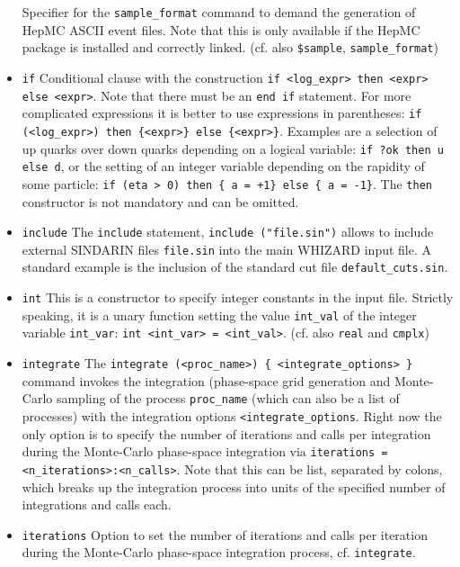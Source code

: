 \documentclass[12pt]{book}
\newcommand{\ttt}[1]{\texttt{#1}}
\begin{document}
\begin{itemize}
Specifier for the \ttt{sample\_format} command to demand the
generation of HepMC ASCII event files. Note that this is only
available if the HepMC package is installed and correctly
linked. (cf. also \ttt{\$sample}, \ttt{sample\_format}) 
\item
\ttt{if} \newline
Conditional clause with the construction \ttt{if <log\_expr> then
<expr> else <expr>}. Note that there must be an \ttt{end if}
statement. For more complicated expressions it is better to use
expressions in parentheses: \ttt{if (<log\_expr>) then
\{<expr>\} else \{<expr>\}}. Examples are a selection of up quarks
over down quarks depending on a logical variable: \ttt{if ?ok then u
  else d}, or the setting of an integer variable depending on the
rapidity of some particle: \ttt{if (eta > 0) then \{ a = +1\} else
\{ a = -1\}}. The \ttt{then} constructor is not mandatory and can be
omitted. 
\item
\ttt{include} \newline
The \ttt{include} statement, \ttt{include ("file.sin")} allows to
include external SINDARIN files \ttt{file.sin} into the main WHIZARD
input file. A standard example is the inclusion of the standard cut
file \ttt{default\_cuts.sin}.
\item
\ttt{int} \newline
This is a constructor to specify integer constants in the input
file. Strictly speaking, it is a unary function setting the value
\ttt{int\_val} of the integer variable \ttt{int\_var}: 
\ttt{int <int\_var> = <int\_val>}. (cf. also \ttt{real} and \ttt{cmplx})
\item
\ttt{integrate} \newline
The \ttt{integrate (<proc\_name>) \{ <integrate\_options> \}} command
invokes the integration (phase-space grid generation and Monte-Carlo
sampling of the process \ttt{proc\_name} (which can also be a list of
processes) with the integration options
\ttt{<integrate\_options}. Right now the only option is to specify the
number of iterations and calls per integration during the Monte-Carlo
phase-space integration via \ttt{iterations =
  <n\_iterations>:<n\_calls>}. Note that this can be list, separated
by colons, which breaks up the integration process into units of the
specified number of integrations and calls each. 
\item
  \ttt{iterations} \newline
  Option to set the number of iterations and calls per iteration during
  the Monte-Carlo phase-space integration process, cf. \ttt{integrate}. 

\end{itemize}
\end{document}
